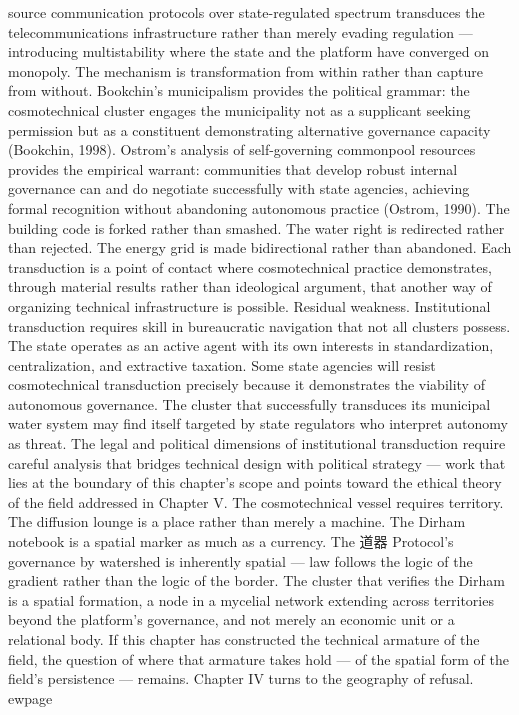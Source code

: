 source communication protocols over state-regulated spectrum transduces the telecommunications infrastructure rather than merely evading regulation — introducing multistability where the state and the platform have converged on monopoly. The mechanism is transformation from within rather than capture from without. Bookchin’s municipalism provides the political grammar: the cosmotechnical cluster engages the municipality not as a supplicant seeking permission but as a constituent demonstrating alternative governance capacity (Bookchin, 1998). Ostrom’s analysis of self-governing commonpool resources provides the empirical warrant: communities that develop robust internal governance can and do negotiate successfully with state agencies, achieving formal recognition without abandoning autonomous practice (Ostrom, 1990). The building code is forked rather than smashed. The water right is redirected rather than rejected. The energy grid is made bidirectional rather than abandoned. Each transduction is a point of contact where cosmotechnical practice demonstrates, through material results rather than ideological argument, that another way of organizing technical infrastructure is possible. Residual weakness. Institutional transduction requires skill in bureaucratic navigation that not all clusters possess. The state operates as an active agent with its own interests in standardization, centralization, and extractive taxation. Some state agencies will resist cosmotechnical transduction precisely because it demonstrates the viability of autonomous governance. The cluster that successfully transduces its municipal water system may find itself targeted by state regulators who interpret autonomy as threat. The legal and political dimensions of institutional transduction require careful analysis that bridges technical design with political strategy — work that lies at the boundary of this chapter’s scope and points toward the ethical theory of the field addressed in Chapter V. The cosmotechnical vessel requires territory. The diffusion lounge is a place rather than merely a machine. The Dirham notebook is a spatial marker as much as a currency. The 道器 Protocol’s governance by watershed is inherently spatial — law follows the logic of the gradient rather than the logic of the border. The cluster that verifies the Dirham is a spatial formation, a node in a mycelial network extending across territories beyond the platform’s governance, and not merely an economic unit or a relational body. If this chapter has constructed the technical armature of the field, the question of where that armature takes hold — of the spatial form of the field’s persistence — remains. Chapter IV turns to the geography of refusal. ewpage
